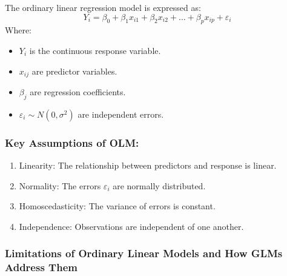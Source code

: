 \documentclass[12pt,a4paper]{article}
\begin{document}
The ordinary linear regression model is expressed as:
\[
Y_i = \beta_0 + \beta_1 x_{i1} + \beta_2 x_{i2} + \dots + \beta_p x_{ip} + \varepsilon_i
\]
Where:
\begin{itemize}
  \item \( Y_i \) is the continuous response variable.
  \item \( x_{ij} \) are predictor variables.
  \item \( \beta_j \) are regression coefficients.
  \item \( \varepsilon_i \sim N(0, \sigma^2) \) are independent errors.
\end{itemize}

\subsubsection*{Key Assumptions of OLM:}
\begin{enumerate}
  \item Linearity: The relationship between predictors and response is linear.
  \item Normality: The errors \( \varepsilon_i \) are normally distributed.
  \item Homoscedasticity: The variance of errors is constant.
  \item Independence: Observations are independent of one another.
\end{enumerate}


\subsubsection*{Limitations of Ordinary Linear Models and How GLMs Address Them}
\end{document}
